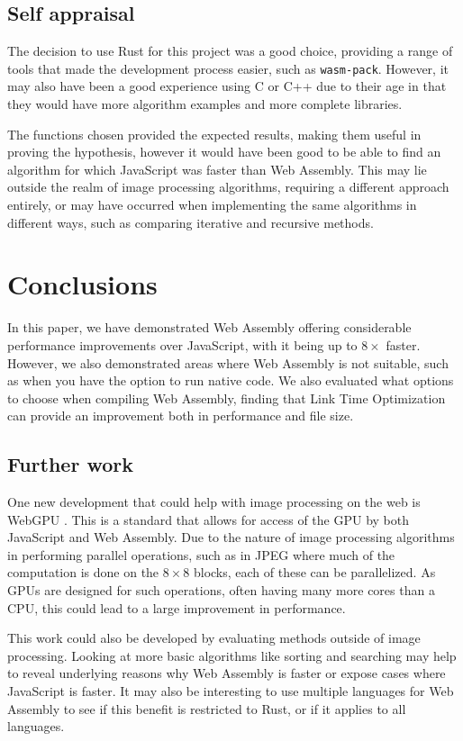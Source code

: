 \documentclass[12pt,a4paper]{article}
\begin{document}
\subsection{Self appraisal}

The decision to use Rust for this project was a good choice, providing a range of tools that made the development process easier, such as \texttt{wasm-pack}. However, it may also have been a good experience using C or C++ due to their age in that they would have more algorithm examples and more complete libraries.

The functions chosen provided the expected results, making them useful in proving the hypothesis, however it would have been good to be able to find an algorithm for which JavaScript was faster than Web Assembly. This may lie outside the realm of image processing algorithms, requiring a different approach entirely, or may have occurred when implementing the same algorithms in different ways, such as comparing iterative and recursive methods.




\section{Conclusions}

In this paper, we have demonstrated Web Assembly offering considerable performance improvements over JavaScript, with it being up to $8\times$ faster. However, we also demonstrated areas where Web Assembly is not suitable, such as when you have the option to run native code. We also evaluated what options to choose when compiling Web Assembly, finding that Link Time Optimization can provide an improvement both in performance and file size.

\subsection{Further work}

One new development that could help with image processing on the web is WebGPU \cite{webgpu}. This is a standard that allows for access of the GPU by both JavaScript and Web Assembly. Due to the nature of image processing algorithms in performing parallel operations, such as in JPEG where much of the computation is done on the $8\times 8$ blocks, each of these can be parallelized. As GPUs are designed for such operations, often having many more cores than a CPU, this could lead to a large improvement in performance.


This work could also be developed by evaluating methods outside of image processing. Looking at more basic algorithms like sorting and searching may help to reveal underlying reasons why Web Assembly is faster or expose cases where JavaScript is faster.
It may also be interesting to use multiple languages for Web Assembly to see if this benefit is restricted to Rust, or if it applies to all languages.



\end{document}
